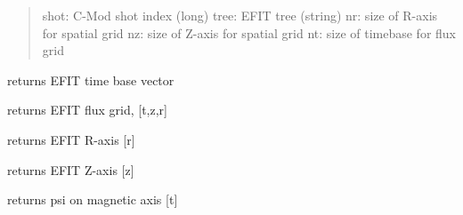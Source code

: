 \documentclass[letterpaper,10pt,english]{sphinxmanual}
\begin{document}
\begin{fulllineitems}
\begin{fulllineitems}
\begin{quote}
shot:   C-Mod shot index (long)
tree:   EFIT tree (string)
nr:     size of R-axis for spatial grid
nz:     size of Z-axis for spatial grid
nt:     size of timebase for flux grid
\end{quote}

\end{fulllineitems}


\begin{fulllineitems}
\label{eqtools:eqtools.EFIT.EFITTree.getTimeBase}
returns EFIT time base vector

\end{fulllineitems}


\begin{fulllineitems}
\label{eqtools:eqtools.EFIT.EFITTree.getFluxGrid}
returns EFIT flux grid, {[}t,z,r{]}

\end{fulllineitems}


\begin{fulllineitems}
\label{eqtools:eqtools.EFIT.EFITTree.getRGrid}
returns EFIT R-axis {[}r{]}

\end{fulllineitems}


\begin{fulllineitems}
\label{eqtools:eqtools.EFIT.EFITTree.getZGrid}
returns EFIT Z-axis {[}z{]}

\end{fulllineitems}


\begin{fulllineitems}
\label{eqtools:eqtools.EFIT.EFITTree.getFluxAxis}
returns psi on magnetic axis {[}t{]}

\end{fulllineitems}


\end{fulllineitems}
\end{document}
